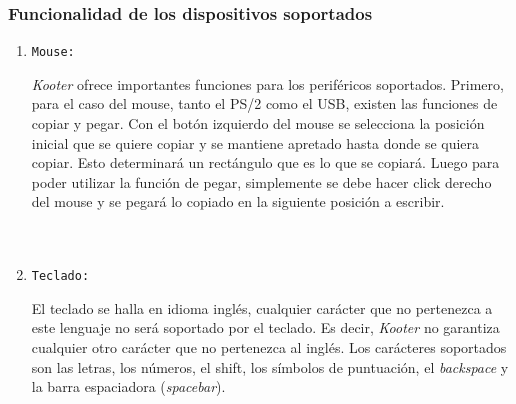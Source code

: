 \documentclass[a4paper,11pt]{article}
\begin{document}
\subsubsection{Funcionalidad de los dispositivos soportados}
\begin{enumerate}
	\item \begin{large}\texttt{Mouse:} \end{large}
\emph{Kooter} ofrece importantes funciones para los periféricos soportados. Primero, para el caso del mouse, tanto el PS/2 como el USB, existen las funciones de copiar y pegar. Con el botón izquierdo del mouse se selecciona la posición inicial que se quiere copiar y se mantiene apretado hasta donde se quiera copiar. Esto determinará un rectángulo que es lo que se copiará. Luego para poder utilizar la función de pegar, simplemente se debe hacer click derecho del mouse y se pegará lo copiado en la siguiente posición a escribir.
\\
\\
\\

	\item \begin{large}\texttt{Teclado:} \end{large}
El teclado se halla en idioma inglés, cualquier carácter que no pertenezca a este lenguaje no será soportado por el teclado. Es decir, \emph{Kooter} no garantiza cualquier otro carácter que no pertenezca al inglés. Los carácteres soportados son las letras, los números, el shift, los símbolos de puntuación, el \emph{backspace} y la barra espaciadora (\emph{spacebar}).
\end{enumerate}
\end{document}
